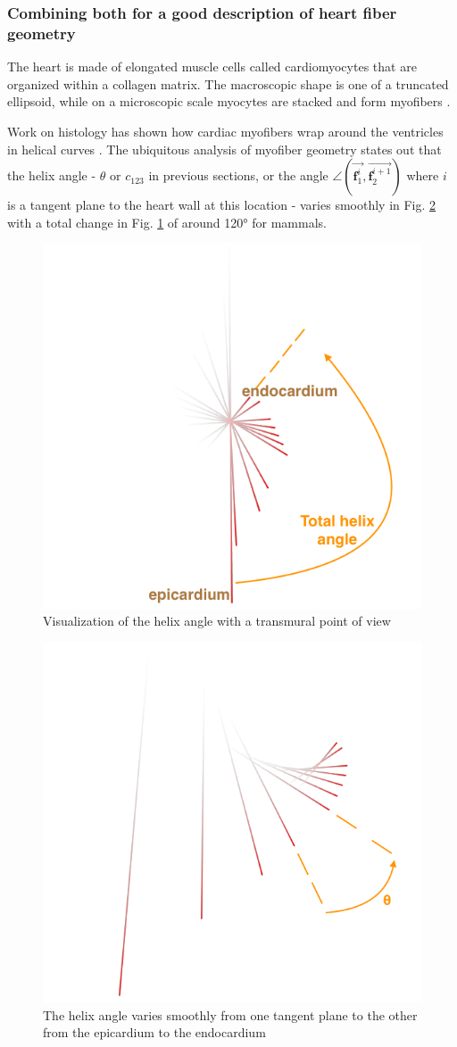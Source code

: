\subsubsection{Combining both for a good description of heart fiber geometry}

The heart is made of elongated muscle cells called cardiomyocytes that are organized within a collagen matrix. The macroscopic shape is one of a truncated ellipsoid, while on a microscopic scale myocytes are stacked and form myofibers \cite{streeter1969fiber}.

Work on histology has shown how cardiac myofibers wrap around the ventricles in helical curves \cite{buckberg2002basic}. The ubiquitous analysis of myofiber geometry states out that the helix angle - $\theta$ or $c_{123}$ in previous sections, or the angle $\angle (\overrightarrow{\mathbf{f}^{i}_1}, \overrightarrow{\mathbf{f}^{i+1}_2})$ where $i$ is a tangent plane to the heart wall at this location - varies smoothly in Fig. \ref{fig:helix_angle} with a total change in Fig. \ref{fig:total_angle} of around 120° for mammals.
\begin{figure}[!t]
    \centering
    \includegraphics[width=.58\textwidth]{figures/total_angle}
    \caption[b]{Visualization of the helix angle with a transmural point of view}
    \label{fig:total_angle}
\end{figure}
\begin{figure}[!t]
    \includegraphics[width=.58\textwidth]{figures/helix_angle}
    \caption{The helix angle varies smoothly from one tangent plane to the other from the epicardium to the endocardium}
    \label{fig:helix_angle}
\end{figure}

